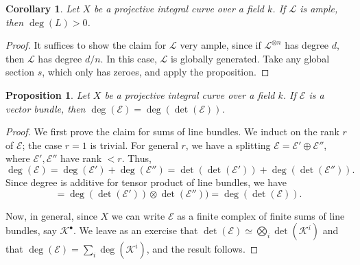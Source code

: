 \documentclass[10pt]{article}
\newtheorem{prop}[thm]{Proposition}
\newtheorem{cor}[thm]{Corollary}
\theoremstyle{definition}
\newcommand{\LL}{\mathcal{L}}
\begin{document}
\begin{cor}
Let $X$ be a projective integral curve over a field $k$.  If $\mathcal{L}$ is ample, then $\deg(L) > 0$.
\end{cor}
\begin{proof}
It suffices to show the claim for $\mathcal{L}$ very ample, since if $\LL^{\otimes n}$ has degree $d$, then $\LL$ has degree $d/n$.  In this case, $\LL$ is globally generated.  Take any global section $s$, which only has zeroes, and apply the proposition. 
\end{proof}

\begin{prop}
Let $X$ be a projective integral curve over a field $k$.  If $\mathcal{E}$ is a vector bundle, then $\deg(\mathcal{E}) = \deg(\det(\mathcal{E}))$.
\end{prop}
\begin{proof}
We first prove the claim for sums of line bundles.  We induct on the rank $r$ of $\mathcal{E}$; the case $r=1$ is trivial.  For general $r$, we have a splitting $\mathcal{E} = \mathcal{E}' \oplus \mathcal{E}''$, where $\mathcal{E}', \mathcal{E}''$ have rank $< r$.  Thus,
$$\deg(\mathcal{E}) = \deg(\mathcal{E}') + \deg(\mathcal{E}'') = \det(\det(\mathcal{E'})) + \deg(\det(\mathcal{E}'')).$$
Since degree is additive for tensor product of line bundles, we have
$$= \deg(\det(\mathcal{E}')) \otimes \det(\mathcal{E}'')) = \deg(\det(\mathcal{E})).$$

Now, in general, since $X$ we can write $\mathcal{E}$ as a finite complex of finite sums of line bundles, say $\mathcal{K}^\bullet$.  We leave as an exercise that $\det(\mathcal{E}) \simeq \bigotimes_i \det(\mathcal{K}^i)$ and that $\deg(\mathcal{E}) = \sum_i \deg(\mathcal{K}^i)$, and the result follows.
\end{proof}
\end{document}
